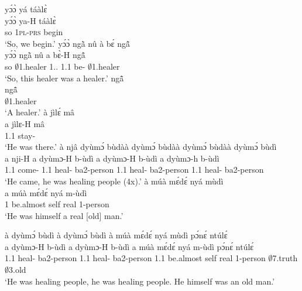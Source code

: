 \begin{exe}[(A34)]
\exA\label{a01}
  \glll    yɔ́ɔ̀ yá táàlɛ̀  \\
          yɔ́ɔ̀ ya-H táàlɛ̀  \\
            so 1\textsc{pl}-\textsc{prs} begin     \\
    \trans `So, we begin.'
\exA\label{a02}
  \glll   yɔ́ɔ̀ ngã̀ nû à bɛ́ ngã̂  \\
          yɔ́ɔ̀ ngã̀ nû a bɛ̀-H ngã̂ \\
         so $\emptyset$1.healer 1.{\DEM}.{\PROX} 1.{\PST}1 be-{\R} $\emptyset$1.healer   \\
    \trans `So, this healer was a healer.'
\exA\label{a03}
  \glll  ngã̂    \\
          ngã̂   \\
          $\emptyset$1.healer       \\
    \trans `A healer.'
\exA\label{a04}
  \glll  à jìlɛ́ mâ   \\
          a jìlɛ-H mâ   \\
         1.{\PST}1 stay-{\R}  {\COMPL}       \\
    \trans `He was there.'
\exA\label{a05}
  \glll  à njâ dyùmɔ́ bùdàà dyùmɔ́ bùdàà dyùmɔ́ bùdàà dyùmɔ́ bùdì  \\
           a nji-H a dyùmɔ-H b-ùdì a dyùmɔ-H  b-ùdì a dyùmɔ-h b-ùdì   \\
          1.{\PST}1 come-{\R} 1.{\PST}1 heal-{\R} ba2-person 1.{\PST}1 heal-{\R} ba2-person 1.{\PST}1 heal-{\R} ba2-person  \\
    \trans `He came, he was healing people (4x).'
\exA\label{a05a}
  \glll  à múà mɛ́dɛ́ nyá mùdì \\
          a múà mɛ́dɛ́ nyá m-ùdì   \\
         1 be.almost self real {\N}1-person    \\
    \trans `He was himself a real [old] man.'
 
\exA\label{a06} 
  \glll  à dyùmɔ́ bùdì à dyùmɔ́ bùdì à múà mɛ́dɛ́ nyá mùdì pɔ́nɛ́ ntúlɛ́    \\
           a dyùmɔ-H b-ùdì a dyùmɔ-H b-ùdì a múà    mɛ́dɛ́ nyá m-ùdì pɔ́nɛ́ ntúlɛ́  \\
           1.{\PST}1 heal-{\R} ba2-person 1.{\PST}1 heal-{\R} ba2-person 1.{\PST}1 be.almost self real {\N}1-person $\emptyset$7.truth $\emptyset$3.old \\
    \trans `He was healing people, he was healing people. He himself was an old man.'
 

\end{exe}
